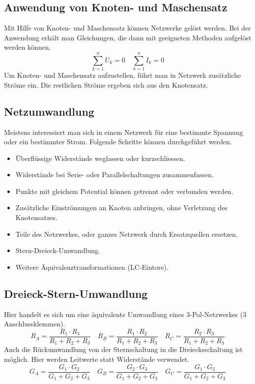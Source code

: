 \subsection{Anwendung von Knoten- und Maschensatz}
Mit Hilfe von Knoten- und Maschensatz können Netzwerke gelöst werden. Bei der Anwendung erhält man Gleichungen, die dann mit geeigneten Methoden aufgelöst werden können.
\begin{equation}
\boxed{\displaystyle \sum_{k=1}^nU_k=0}\quad \boxed{\displaystyle \sum_{k=1}^nI_k=0}
\end{equation}
Um Knoten- und Maschensatz aufzustellen, führt man in Netzwerk zusätzliche Ströme ein. Die restlichen Ströme ergeben sich aus den Knotensatz.
\subsection{Netzumwandlung}
Meistens interessiert man sich in einem Netzwerk für eine bestimmte Spannung oder ein bestimmter Strom. Folgende Schritte können durchgeführt werden.
\begin{itemize}
\item Überflüssige Widerstände weglassen oder kurzschliessen.
\item Widerstände bei Serie- oder Parallelschaltungen zusammenfassen.
\item Punkte mit gleichem Potential können getrennt oder verbunden werden.
\item Zusätzliche Einströmungen an Knoten anbringen, ohne Verletzung des Knotensatzes.
\item Teile des Netzwerkes, oder ganzes Netzwerk durch Ersatzquellen ersetzen.
\item Stern-Dreieck-Umwandlung.
\item Weitere Äquivalenztransformationen (LC-Eintore).
\end{itemize}
\subsection{Dreieck-Stern-Umwandlung}
Hier handelt es sich um eine äquivalente Umwandlung eines 3-Pol-Netzwerkes (3 Anschlussklemmen).
\begin{equation}
\boxed{R_A=\dfrac{R_1\cdot R_3}{R_1+R_2+R_3}}\quad \boxed{R_B=\dfrac{R_1\cdot R_2}{R_1+R_2+R_3}}\quad \boxed{R_C=\dfrac{R_2\cdot R_3}{R_1+R_2+R_3}}
\end{equation}
Auch die Rückumwandlung von der Sternschaltung in die Dreiecksschaltung ist möglich. Hier werden Leitwerte statt Widerstände verwendet.
\begin{equation}
\boxed{G_A=\dfrac{G_1\cdot G_2}{G_1+G_2+G_3}}\quad \boxed{G_B=\dfrac{G_2\cdot G_3}{G_1+G_2+G_3}}\quad \boxed{G_C=\dfrac{G_1\cdot G_3}{G_1+G_2+G_3}}
\end{equation}
